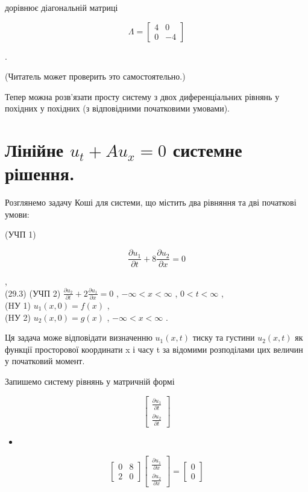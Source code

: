 \documentclass[
  ukrainian,
]{article}
\providecommand{\tightlist}{%
  \setlength{\itemsep}{0pt}\setlength{\parskip}{0pt}}
\begin{document}
дорівнює діагональній матриці

\[
\Lambda =
\begin{bmatrix} 4 & 0 \\ 0 & -4 \end{bmatrix}
\]

.

(Читатель может проверить это самостоятельно.)

Тепер можна розв'язати просту систему з двох диференціальних рівнянь у
похідних у похідних (з відповідними початковими умовами).

\section{\texorpdfstring{Лінійне \(u_t + Au_x = 0\) системне
рішення.}{Лінійне u\_t + Au\_x = 0 системне рішення.}}\label{ux43bux456ux43dux456ux439ux43dux435-u_t-au_x-0-ux441ux438ux441ux442ux435ux43cux43dux435-ux440ux456ux448ux435ux43dux43dux44f.}

Розглянемо задачу Коші для системи, що містить два рівняння та дві
початкові умови:

(УЧП 1)

\[
\frac{\partial u_1}{\partial t} + 8 \frac{\partial u_2}{\partial x} = 0
\]

,\\
(29.3) (УЧП 2)
\(\frac{\partial u_2}{\partial t} + 2 \frac{\partial u_1}{\partial x} = 0\)
, \(-\infty < x < \infty\) , \(0 < t < \infty\) ,\\
(HУ 1) \(u_1(x, 0) = f(x)\) ,\\
(HУ 2) \(u_2(x, 0) = g(x)\) , \(-\infty < x < \infty\) .

Ця задача може відповідати визначенню \(u_1(x, t)\) тиску та густини
\(u_2(x, t)\) як функції просторової координати x і часу t за відомими
розподілами цих величин у початковий момент.

Запишемо систему рівнянь у матричній формі

\[
\begin{bmatrix} \frac{\partial u_1}{\partial t} \\ \frac{\partial u_2}{\partial t} \end{bmatrix}
\]

\begin{itemize}
\tightlist
\item
\end{itemize}

\[
\begin{bmatrix} 0 & 8 \\ 2 & 0 \end{bmatrix}
\begin{bmatrix} \frac{\partial u_1}{\partial x} \\ \frac{\partial u_2}{\partial x} \end{bmatrix}
=
\begin{bmatrix} 0 \\ 0 \end{bmatrix}
\]
\end{document}
